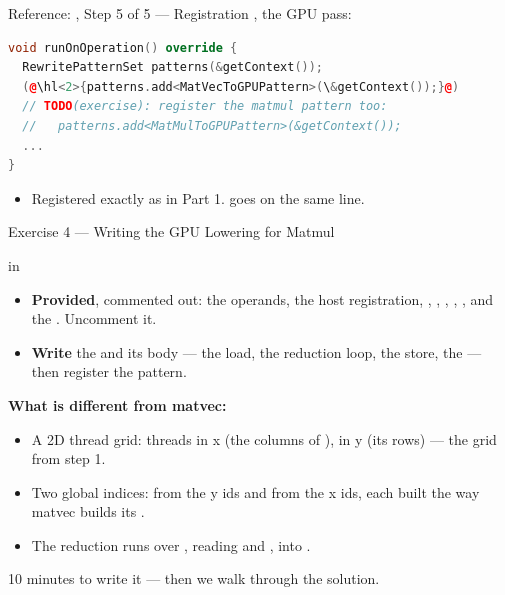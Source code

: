 \documentclass[aspectratio=169,10pt]{beamer}
\begin{document}
\begin{frame}[fragile]{Reference: , Step 5 of 5 --- Registration}
  , the GPU pass:
\begin{lstlisting}[language=C++,basicstyle=\ttfamily\scriptsize,morekeywords={void,override}]
void runOnOperation() override {
  RewritePatternSet patterns(&getContext());
  (@\hl<2>{patterns.add<MatVecToGPUPattern>(\&getContext());}@)
  // TODO(exercise): register the matmul pattern too:
  //   patterns.add<MatMulToGPUPattern>(&getContext());
  ...
}
\end{lstlisting}
  \vspace{0.3em}
  \begin{itemize}
    \item<2-> Registered exactly as in Part 1.  goes on the same line.
  \end{itemize}
\end{frame}

\begin{frame}{Exercise 4 --- Writing the GPU Lowering for Matmul}
  \begin{center}\large
     in 
  \end{center}
  \vspace{0.3em}
  \begin{itemize}
    \item \textbf{Provided}, commented out: the operands, the host
      registration, , , , , , and the
      . Uncomment it.
    \item \textbf{Write} the  and its body ---
      the load, the reduction loop, the store, the  ---
      then register the pattern.
  \end{itemize}
  \vspace{0.3em}
  \textbf{What is different from matvec:}
  \begin{itemize}
    \item A 2D thread grid:  threads in x (the columns of ),
       in y (its rows) --- the grid from step 1.
    \item Two global indices:  from the y ids and  from the x
      ids, each built the way matvec builds its .
    \item The reduction runs over , reading  and
      , into .
  \end{itemize}
  \vspace{0.4em}
  \begin{center}\color{scaccent}\large
    10 minutes to write it --- then we walk through the solution.
  \end{center}
\end{frame}
\end{document}
